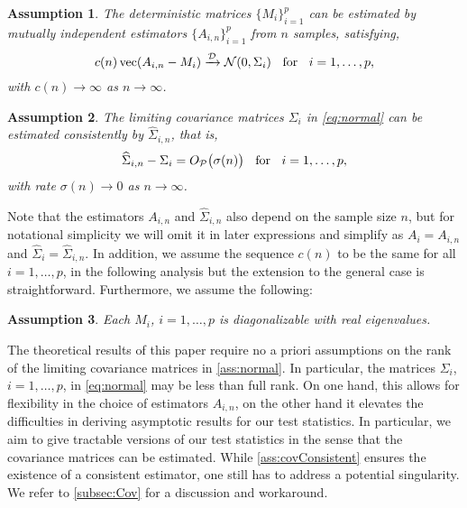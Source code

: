 \documentclass[12pt]{article}
\newtheorem{ass}{Assumption}
\numberwithin{thm}{section}
\numberwithin{defn}{section}
\numberwithin{lem}{section}
\numberwithin{prop}{section}
\numberwithin{cor}{section}
\numberwithin{rem}{section}
\DeclareMathOperator{\Vector}{vec}
\begin{document}
\begin{ass}\label{ass:normal}
The deterministic matrices $\{M_i\}_{i = 1}^p$ can be estimated by mutually independent estimators $\{A_{i,n}\}_{i = 1}^p$ from $n$ samples, satisfying,
\begin{equation}\label{eq:normal}
    c(n)\Vector(A_{i,n} - M_i) \xrightarrow{\mathcal{D}} \mathcal{N}(0, \Sigma_i) \hspace{0.2cm} \text{ for } \hspace{0.2cm} i=1,\dots,p,
\end{equation}
with $c(n) \to \infty$ as $n \to \infty$.
\end{ass}

\begin{ass}\label{ass:covConsistent}
The limiting covariance matrices $\Sigma_i$ in \eqref{eq:normal} can be estimated consistently by $\widehat{\Sigma}_{i,n}$, that is,
\begin{equation}\label{eq:sigma.rate}
    \widehat{\Sigma}_{i,n} - \Sigma_i = O_{\mathcal{P}}\big(\sigma(n)\big)
     \hspace{0.2cm} \text{ for } \hspace{0.2cm} i=1,\dots,p,
\end{equation}
with rate $\sigma(n) \to 0$ as $n \to \infty$.
\end{ass}

Note that the estimators $A_{i,n}$ and $\widehat{\Sigma}_{i,n}$ also depend on the sample size $n$, but for notational simplicity we will omit it in later expressions and simplify as $A_i = A_{i,n}$ and $\widehat{\Sigma}_i = \widehat{
\Sigma}_{i,n}$. In addition, we assume the sequence $c(n)$ to be the same for all $i = 1, \dots, p$, in the following analysis but the extension to the general case is straightforward. Furthermore, we assume the following:
\begin{ass}\label{ass:distinct}
Each $M_i$, $i=1,\dots,p$ is diagonalizable with real eigenvalues.
\end{ass}


The theoretical results of this paper require no a priori assumptions on the rank of the limiting covariance matrices in \autoref{ass:normal}. In particular, the matrices $\Sigma_{i}$, $i = 1, \dots, p$, in \eqref{eq:normal} may be less than full rank. On one hand, this allows for flexibility in the choice of estimators $A_{i,n}$, on the other hand it elevates the difficulties in deriving asymptotic results for our test statistics. In particular, we aim to give tractable versions of our test statistics in the sense that the covariance matrices can be estimated. While \autoref{ass:covConsistent} ensures the existence of a consistent estimator, one still has to address a potential singularity. We refer to \autoref{subsec:Cov} for a discussion and workaround.
\end{document}
